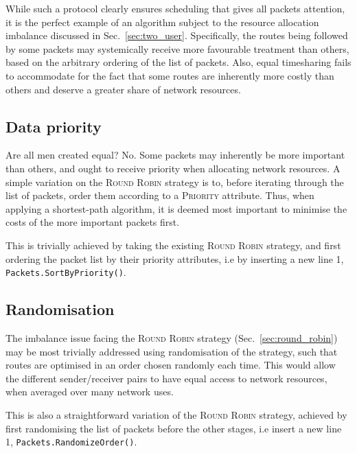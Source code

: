 \documentclass[aps,rmp,twocolumn,amsmath,amssymb,nofootinbib,superscriptaddress,longbibliography,floatfix,table-of-contents,eqsecnum]{revtex4-1}
\begin{document}
While such a protocol clearly ensures scheduling that gives all packets attention, it is the perfect example of an algorithm subject to the resource allocation imbalance discussed in Sec.~\ref{sec:two_user}. Specifically, the routes being followed by some packets may systemically receive more favourable treatment than others, based on the arbitrary ordering of the list of packets. Also, equal timesharing fails to accommodate for the fact that some routes are inherently more costly than others and deserve a greater share of network resources.

%
%

\subsection{Data priority} \label{sec:data_priority} 

Are all men created equal? No. Some packets may inherently be more important than others, and ought to receive priority when allocating network resources. A simple variation on the \textsc{Round Robin} strategy is to, before iterating through the list of packets, order them according to a \textsc{Priority} attribute. Thus, when applying a shortest-path algorithm, it is deemed most important to minimise the costs of the more important packets first.

This is trivially achieved by taking the existing \textsc{Round Robin} strategy, and first ordering the packet list by their priority attributes, i.e by inserting a new line 1, \mbox{\texttt{Packets.SortByPriority()}}.

%
%

\subsection{Randomisation} \label{sec:random} 

The imbalance issue facing the \textsc{Round Robin} strategy (Sec.~\ref{sec:round_robin}) may be most trivially addressed using randomisation of the strategy, such that routes are optimised in an order chosen randomly each time. This would allow the different sender/receiver pairs to have equal access to network resources, when averaged over many network uses.

This is also a straightforward variation of the \textsc{Round Robin} strategy, achieved by first randomising the list of packets before the other stages, i.e insert a new line 1, \mbox{\texttt{Packets.RandomizeOrder()}}.
\end{document}
